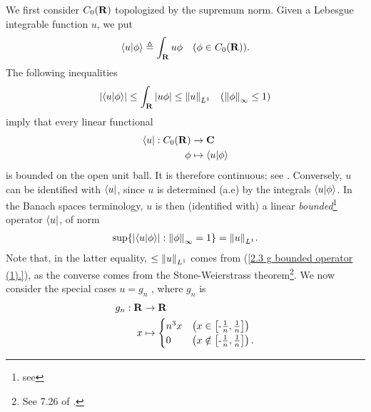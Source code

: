 We first consider %
%
  $C_0(\R)$ %
%
topologized by the supremum norm. %
Given a Lebesgue integrable function $u$, we put %
  \begin{align}
    \bra{u}\ket{\phi} 
      \Def 
    \int_\R u\phi  
      \quad(\phi \in C_0(\R)).
  \end{align}
%
The following inequalities %
%
  \begin{align}\label{2.3  g  bounded operator (1).}
    \left\lvert\bra{u}\ket{\phi}\right\rvert 
      \leq 
    \int_\R \left\lvert u\phi \right\rvert 
      \leq
    \norma{L^1}{u}
      \quad(\norma{\infty}{\phi} \leq 1)
  \end{align} 
%
imply that every linear functional 
%
  \begin{align}
    \bra{u}: C_0(\R) &\to \C \\
             \phi    &\mapsto \bra{u}\ket{\phi} \nonumber
  \end{align}
%
is bounded on the open unit ball. It is therefore continuous; %
%
  see . %
%
Conversely, ${u}$ can be identified with %
%
  $\bra{u}$, %
%
since $u$ is determined (a.e) by the integrals %
%
  $\bra{u}\ket{\phi}$. %
%
In the Banach spaces terminology, 
% 
  $u$ is then (identified with) a linear \textit{bounded}\hspace{2pt}\footnote{
    see 
  } %
operator $\bra{u}$, of norm %
%
  \begin{align}\label{2.3  g  bounded operator (2).}
    \sup\set{
      \magnitude{\bra{u}\ket{\phi}}
    }{ 
      \norma{\infty}{\phi} = 1
    } 
    =  \norma{L^1}{u}.
  \end{align} 
%
Note that, in the latter equality, $\leq \norma{L^1}{u}$ comes from %
%
  (\ref{2.3  g  bounded operator (1).}), %
%
as the converse comes from the Stone-Weierstrass theorem\footnote{
%
  See 7.26 of \cite{BabyRudin}.
}. %
%
We now consider the special cases %
%
  $u = g_n$ %
%
, where $g_n$ is %
%
  \begin{align}
    g_n : \R & \to \R\\
           x & \mapsto \begin{cases} 
  n^3 x & \left(x \in    \left[\minus \frac{1}{n}, \frac{1}{n}\right]\right)\\
  0     & \left(x \notin \left[\minus \frac{1}{n}, \frac{1}{n}\right]\right).
  \end{cases}\nonumber
  \end{align}
